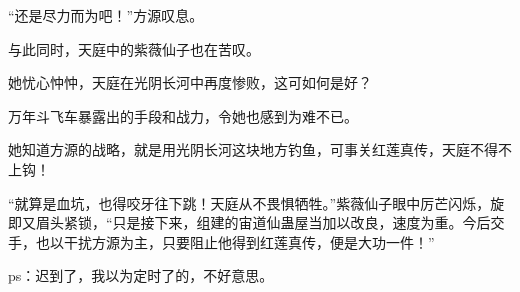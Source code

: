 \begin{this_body}
“还是尽力而为吧！”方源叹息。

与此同时，天庭中的紫薇仙子也在苦叹。

她忧心忡忡，天庭在光阴长河中再度惨败，这可如何是好？

万年斗飞车暴露出的手段和战力，令她也感到为难不已。

她知道方源的战略，就是用光阴长河这块地方钓鱼，可事关红莲真传，天庭不得不上钩！

“就算是血坑，也得咬牙往下跳！天庭从不畏惧牺牲。”紫薇仙子眼中厉芒闪烁，旋即又眉头紧锁，“只是接下来，组建的宙道仙蛊屋当加以改良，速度为重。今后交手，也以干扰方源为主，只要阻止他得到红莲真传，便是大功一件！”

ps：迟到了，我以为定时了的，不好意思。

\end{this_body}

